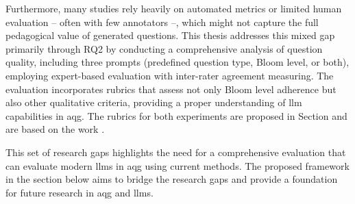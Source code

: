 Furthermore, many studies rely heavily on automated metrics or limited human evaluation \cite{zhuge_twinstar_2025,blobstein_angel_2023,li_planning_2024} -- often with few annotators --, which might not capture the full pedagogical value of generated questions. This thesis addresses this mixed gap primarily through RQ2 by conducting a comprehensive analysis of question quality, including three prompts (predefined question type, Bloom level, or both), employing expert-based evaluation with inter-rater agreement measuring. The evaluation incorporates rubrics that assess not only Bloom level adherence but also other qualitative criteria, providing a proper understanding of \ac{llm} capabilities in \ac{aqg}. The rubrics for both experiments are proposed in Section  and are based on the work \cite{mi_comparative_2024}.

This set of research gaps highlights the need for a comprehensive evaluation that can evaluate modern \acp{llm} in \ac{aqg} using current methods. The proposed framework in the section below aims to bridge the research gaps and provide a foundation for future research in \ac{aqg} and \acp{llm}.